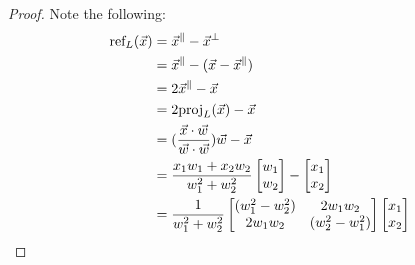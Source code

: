 \documentclass[a4paper,11pt]{article}
\begin{document}
\begin{outline}
    \begin{proof}
      Note the following:
      \begin{align*}
        \text{ref}_{L}(\vec{x}) &= \vec{x}^{\parallel} - \vec{x}^{\perp}\\
                                &= \vec{x}^{\parallel} - (\vec{x} - \vec{x}^{\parallel})\\
                                &= 2\vec{x}^{\parallel} - \vec{x}\\
                                &= 2\text{proj}_{L}(\vec{x})- \vec{x}\\
                                &= (\frac{\vec{x}\cdot\vec{w}}{\vec{w}\cdot\vec{w}})\vec{w} - \vec{x}\\
                                &= \frac{x_1w_1 + x_2w_2}{w_1^2 + w_2^2} \begin{bmatrix} w_1 \\ w_2 \end{bmatrix}-
                                   \begin{bmatrix} x_1 \\ x_2 \end{bmatrix}\\
                                &= \frac{1}{w_1^2 + w_2^2}
                                   \begin{bmatrix}
                                     (w_1^2 - w_2^2) & 2w_1w_2 \\ 
                                     2w_1w_2 & (w_2^2 - w_1^2) 
                                   \end{bmatrix}
                                   \begin{bmatrix} x_1 \\ x_2 \end{bmatrix}
      \end{align*}
    \end{proof}

\end{outline}
      
\end{document}
